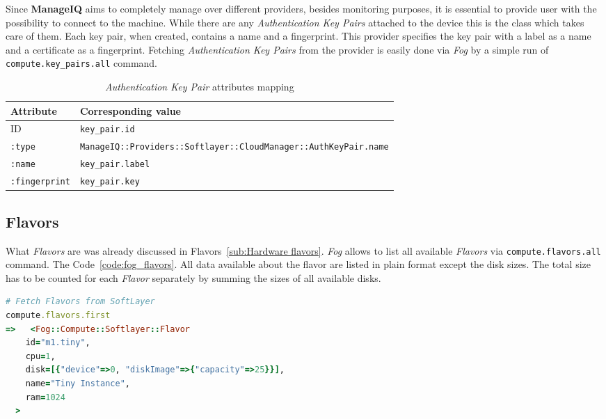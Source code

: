 Since \textbf{ManageIQ} aims to completely manage over different providers, besides monitoring purposes, it is essential to provide user with the possibility to connect to the machine. While there are any \emph{Authentication Key Pairs} attached to the device this is the class which takes care of them. Each key pair, when created, contains a name and a fingerprint. This provider specifies the key pair with a label as a name and a certificate as a fingerprint. Fetching \emph{Authentication Key Pairs} from the provider is easily done via \emph{Fog} by a simple run of \verb|compute.key_pairs.all| command.

\begin{table}[ht]
	\centering
	\caption{\emph{Authentication Key Pair} attributes mapping}\label{tab:Authentication Key Pair attributes mapping}
	\begin{tabular}{ll}
		\toprule
		Attribute           & Corresponding value                                                         \\
		\midrule
		ID                  & \verb|key_pair.id|                                                          \\
		\verb|:type|        & \small\verb|ManageIQ::Providers::Softlayer::CloudManager::AuthKeyPair.name| \\
		\verb|:name|        & \verb|key_pair.label|                                                       \\
		\verb|:fingerprint| & \verb|key_pair.key|                                                         \\
		\bottomrule
	\end{tabular}
\end{table}

\subsection{Flavors}
\label{sub:Flavors}

What \emph{Flavors} are was already discussed in Flavors~\ref{sub:Hardware flavors}. \emph{Fog} allows to list all available \emph{Flavors} via \verb|compute.flavors.all| command. The Code~\ref{code:fog_flavors}. All data available about the flavor are listed in plain format except the disk sizes. The total size has to be counted for each \emph{Flavor} separately by summing the sizes of all available disks.

\begin{lstlisting}[language=Ruby,caption={Sample of \emph{Flavors} data},label=code:fog_flavors,float=htpb]
# Fetch Flavors from SoftLayer
compute.flavors.first
=>   <Fog::Compute::Softlayer::Flavor
    id="m1.tiny",
    cpu=1,
    disk=[{"device"=>0, "diskImage"=>{"capacity"=>25}}],
    name="Tiny Instance",
    ram=1024
  >
\end{lstlisting}

